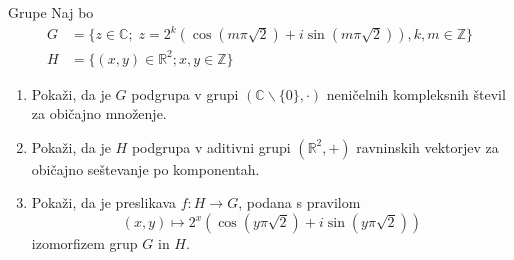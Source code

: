 \begin{frame}{Grupe}
	Naj bo
	\begin{align*}
		G & = \{ z\in \mathbb{C};\; z = {2}^{k} (\cos(m\pi\sqrt{2})+ i \sin(m\pi\sqrt{2})), k, m \in \mathbb{Z}  \} \\
		H & = \{ (x,y) \in {\mathbb{R}}^{2}; x,y \in \mathbb{Z} \}
		\end{align*} 
	\begin{enumerate}
		\item
			Pokaži, da je $G$ podgrupa v grupi $ (\mathbb{C}\backslash \{0\}, \cdot)$
			neničelnih kompleksnih števil za običajno množenje.
		\item
			Pokaži, da je $H$ podgrupa v aditivni grupi $({\mathbb{R}}^{2}, +)$
			ravninskih vektorjev za običajno seštevanje po komponentah.
		\item
			Pokaži, da je preslikava $f:H\to G$, podana s pravilom
			$$
			(x,y) \mapsto {2}^{x}(\cos(y\pi\sqrt{2})+i\sin(y\pi\sqrt{2}))
			$$
			izomorfizem grup $G$ in $H$.
	\end{enumerate}
\end{frame}
